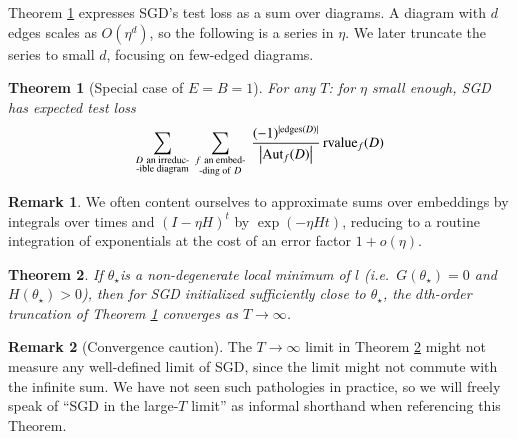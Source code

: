 \documentclass[openany, notitlepage, justified]{tufte-book}
\theoremstyle{plain}
\newtheorem{thm}{Theorem}
\theoremstyle{definition}
\newtheorem{rmk}{Remark}
\newcommand{\wabs}[1]{\left|#1\right|}
\newcommand{\Aut}{\text{\textnormal{Aut}}}
\newcommand{\rvalue}{\text{\textnormal{rvalue}}}
\newcommand{\edges}{\text{\textnormal{edges}}}
\begin{document}
        Theorem \ref{thm:resum} expresses SGD's test loss as a sum over
        diagrams.  A diagram with $d$ edges scales as $O(\eta^d)$, so the
        following is a series in $\eta$.  We later truncate the series to small
        $d$, focusing on few-edged diagrams.
        \begin{thm}[Special case of $E=B=1$] \label{thm:resum}
            For any $T$: for $\eta$ small enough, SGD has expected test loss
            \begin{equation*} \label{eq:resum}
                \sum_{\substack{D~\text{an irreduc-} \\ \text{-ible diagram}}}
                ~
                \sum_{\substack{f~\text{an embed-} \\ \text{-ding of}~D}}
                ~
                \frac{(-1)^{|\edges(D)|}}{\wabs{\Aut_f(D)}}
                \,
                {\rvalue_f}(D)
            \end{equation*}
        \end{thm}

 
        \begin{rmk} \label{rmk:integrate}
            We often content ourselves to approximate sums over embeddings by
            integrals over times and $(I-\eta H)^t$ by $\exp(- \eta H t)$,
            reducing to a routine integration of exponentials at the cost of an
            error factor $1 + o(\eta)$.
        \end{rmk}

 
        \begin{thm} \label{thm:converge}
            If $\theta_\star$is a non-degenerate local minimum of $l$ (i.e.\
            $G(\theta_\star)=0$ and $H(\theta_\star) > 0$), then for SGD
            initialized sufficiently close to $\theta_\star$, the $d$th-order
            truncation of Theorem \ref{thm:resum} converges as $T\to \infty$.
        \end{thm}

        \begin{rmk}[Convergence caution]
            The $T\to \infty$ limit in Theorem \ref{thm:converge} might
            not measure any well-defined limit of SGD, since the limit might not
            commute with the infinite sum.  We have not seen such pathologies in
            practice, so we will freely speak of ``SGD in the large-$T$ limit'' as
            informal shorthand when referencing this Theorem.
        \end{rmk}
\end{document}
